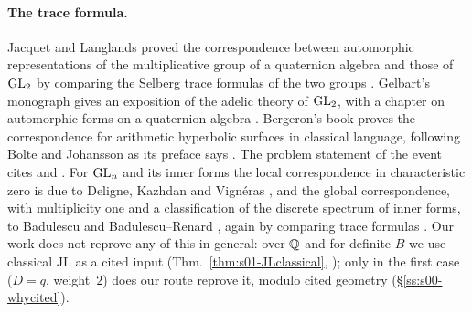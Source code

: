 \paragraph{The trace formula.} Jacquet and Langlands proved the correspondence between automorphic representations of the
multiplicative group of a quaternion algebra and those of $\mathrm{GL}_2$ by comparing the Selberg trace formulas of the two groups
\cite[Thm.~16.1]{JL}. Gelbart's monograph gives an exposition of the adelic theory of $\mathrm{GL}_2$, with a chapter on automorphic forms
on a quaternion algebra \cite[\S10]{Gel75}. Bergeron's book proves the correspondence for arithmetic hyperbolic surfaces in
classical language, following Bolte and Johansson as its preface says \cite[Ch.~8]{Bergeron16}. The problem statement of the
event cites \cite{JL} and \cite[Ch.~8]{Bergeron16}. For $\mathrm{GL}_n$ and its inner forms the local correspondence in characteristic
zero is due to Deligne, Kazhdan and Vign\'eras \cite{DKV84}, and the global correspondence, with multiplicity one and a
classification of the discrete spectrum of inner forms, to Badulescu \cite[Thm.~5.1]{Bad08} and Badulescu--Renard
\cite[Thm.~18.1]{BR10}, again by comparing trace formulas \cite[\S18]{BR10}. Our work does not reprove any of this in general: over
$\mathbb{Q}$ and for definite $B$ we use classical JL as a cited input (Thm.~\ref{thm:s01-JLclassical}, \stcited); only in the first case
($D=q$, weight~$2$) does our route reprove it, modulo cited geometry (\S\ref{ss:s00-whycited}).


